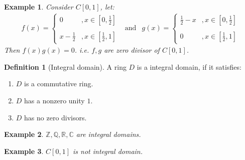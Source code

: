 \documentclass{article}
\theoremstyle{MyNonumberplain}
\theoremstyle{break}
\newcommand{\tmop}{\text}
\theoremstyle{break}
\newtheorem{example}{Example}[section]
\theoremstyle{break}
\theoremstyle{definition}
\theoremstyle{break}
\newtheorem{definition}{Definition}[section]
\begin{document}
\begin{expbox}
    \begin{example}
        Consider $C [0, 1]$, let:
        \begin{eqnarray*}
          f (x) = \left\{\begin{array}{ll}
            0 & , x \in \left[ 0, \frac{1}{2} \right]\\\\
            x - \frac{1}{2} & , x \in \left[ \frac{1}{2}, 1 \right]
          \end{array}\right. & \tmop{and} & g (x) = \left\{\begin{array}{ll}
            \frac{1}{2} - x & , x \in \left[ 0, \frac{1}{2} \right]\\\\
            0 & , x \in \left[ \frac{1}{2}, 1 \right]
          \end{array}\right.
        \end{eqnarray*}
        Then $f (x) g (x) = 0$. i.e. $f, g$ are zero divisor of $C [0, 1]$.
    \end{example}
\end{expbox}

\begin{defbox}
    \begin{definition}[Integral domain]
        A ring $D$ is a integral domain, if it satisfies:\\
        \begin{enumerate}
          \item $D$ is a commutative ring.\bigskip
          
          \item $D$ has a nonzero unity $1$.\bigskip
          
          \item $D$ has no zero divisors.
        \end{enumerate}
    \end{definition}
\end{defbox}

\begin{expbox}
    \begin{example}
        $\mathbb{Z}, \mathbb{Q}, \mathbb{R}, \mathbb{C}$ are integral domains.
    \end{example}
\end{expbox}

\begin{expbox}
    \begin{example}
        $C [0, 1]$ is not integral domain.
    \end{example}
\end{expbox}
\end{document}
